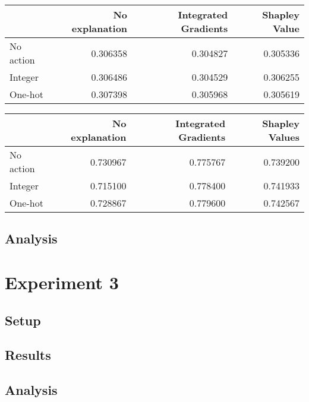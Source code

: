 \documentclass[UKenglish]{uiomasterthesis}
\begin{document}
\begin{center}
\label{tab:state_simpl_lstm}
\begin{tabular}{lrrr}
\toprule
 & No explanation & Integrated Gradients & Shapley Value \\
\midrule
No action & 0.306358 & 0.304827 & 0.305336 \\
Integer & 0.306486 & 0.304529 & 0.306255 \\
One-hot & 0.307398 & 0.305968 & 0.305619 \\
\bottomrule
\end{tabular}
\end{center}

\begin{center}
\label{tab:event_simpl_lstm}
\begin{tabular}{lrrr}
\toprule
 & No explanation & Integrated Gradients & Shapley Values \\
\midrule
No action & 0.730967 & 0.775767 & 0.739200 \\
Integer & 0.715100 & 0.778400 & 0.741933 \\
One-hot & 0.728867 & 0.779600 & 0.742567 \\
\bottomrule
\end{tabular}
\end{center}

\subsection{Analysis}

\begin{figure}[!ht]
	
\end{figure}

\section{Experiment 3}
\subsection{Setup}
\subsection{Results}
\subsection{Analysis}
\end{document}
